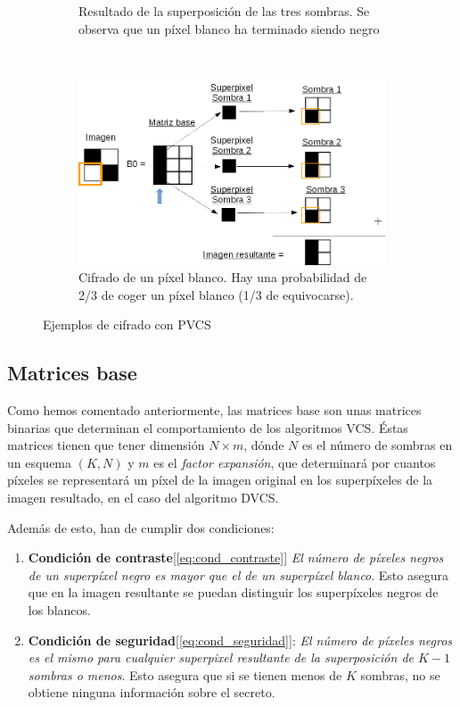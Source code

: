 \begin{figure}[ht]
\begin{subfigure}[t]{0.3\textwidth}
		\caption{Resultado de la superposición de las tres sombras. Se
			observa que un píxel blanco ha terminado siendo negro}
		\label{fig:cifradoPVCSres}
	\end{subfigure}
	\\[0.5cm]
	\begin{subfigure}[t]{0.6\textwidth}
		\centering
		\includegraphics[width=\textwidth]{images/PVCSblanco}
		\caption{Cifrado de un píxel blanco. Hay una probabilidad de 2/3
		de coger un píxel blanco (1/3 de equivocarse).}
		\label{fig:cifradoPVCSb}
	\end{subfigure}
	\caption{Ejemplos de cifrado con PVCS}
	\label{fig:ejemplosPVCS}
\end{figure}
\subsection{Matrices base}
\label{sec:matrices_base}
Como hemos comentado anteriormente, las matrices base son unas matrices binarias
que determinan el comportamiento de los algoritmos VCS. Éstas matrices tienen
que tener dimensión $N\times m$, dónde $N$ es el número de sombras en un esquema
$(K,N)$ y $m$ es el \textsl{factor expansión}, que determinará por cuantos
píxeles se representará un píxel de la imagen original en los superpíxeles de la
imagen resultado, en el caso del algoritmo DVCS.

Además de esto, han de cumplir dos condiciones:
\begin{enumerate}
	\item \textbf{Condición de contraste}[\ref{eq:cond_contraste}] \textsl{El
		número de píxeles negros de un superpíxel negro es mayor que el
		de un superpíxel blanco}. Esto asegura que en la imagen
		resultante se puedan distinguir los superpíxeles negros de los
		blancos.
	\item \textbf{Condición de seguridad}[\ref{eq:cond_seguridad}]: \textsl{El
		número de píxeles negros es el mismo para cualquier superpixel
		resultante de la superposición de $K-1$ sombras o menos}. Esto
		asegura que si se tienen menos de $K$ sombras, no se obtiene
		ninguna información sobre el secreto.
\end{enumerate}

